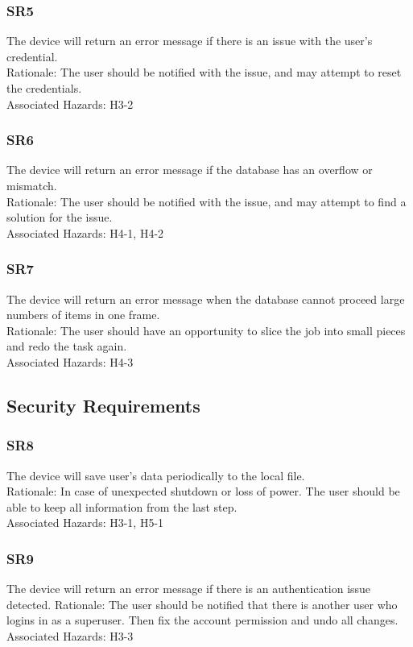 \documentclass{article}
\begin{document}
\subsubsection{SR5}
The device will return an error message if there is an issue with the user’s credential.\\
Rationale: The user should be notified with the issue, and may attempt to reset the credentials.\\
Associated Hazards: H3-2
\subsubsection{SR6}
The device will return an error message if the database has an overflow or mismatch.\\
Rationale: The user should be notified with the issue, and may attempt to find a solution for the issue.\\
Associated Hazards: H4-1, H4-2
\subsubsection{SR7}
The device will return an error message when the database cannot proceed large numbers of items in one frame.\\
Rationale: The user should have an opportunity to slice the job into small pieces and redo the task again.\\
Associated Hazards: H4-3

\subsection{Security Requirements}
\subsubsection{SR8}
The device will save user’s data periodically to the local file.\\
Rationale: In case of unexpected shutdown or loss of power. The user should be able to keep all information from the last step.\\
Associated Hazards: H3-1, H5-1
\subsubsection{SR9}
The device will return an error message if there is an authentication issue detected.
Rationale: The user should be notified that there is another user who logins in as a superuser. Then fix the account permission and undo all changes.
Associated Hazards: H3-3
\end{document}

